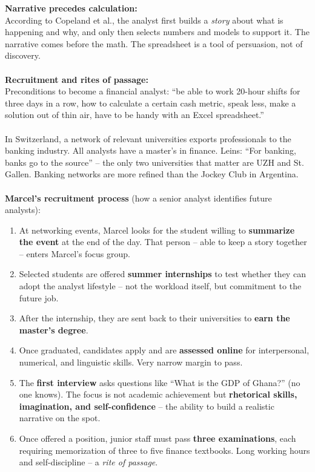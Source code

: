 \documentclass[a4paper,12pt]{article}
\begin{document}
\noindent \textbf{Narrative precedes calculation:} \\
\noindent According to Copeland et al., the analyst first builds a \emph{story} about what is happening and why, and only then selects numbers and models to support it. The narrative comes before the math. The spreadsheet is a tool of persuasion, not of discovery. \\
\\
\noindent \textbf{Recruitment and rites of passage:} \\
\noindent Preconditions to become a financial analyst: ``be able to work 20-hour shifts for three days in a row, how to calculate a certain cash metric, speak less, make a solution out of thin air, have to be handy with an Excel spreadsheet.'' \\
\\
\noindent In Switzerland, a network of relevant universities exports professionals to the banking industry. All analysts have a master's in finance. Leins: ``For banking, banks go to the source'' -- the only two universities that matter are UZH and St. Gallen. Banking networks are more refined than the Jockey Club in Argentina. \\
\\
\noindent \textbf{Marcel's recruitment process} (how a senior analyst identifies future analysts):
\begin{enumerate}
	\item At networking events, Marcel looks for the student willing to \textbf{summarize the event} at the end of the day. That person -- able to keep a story together -- enters Marcel's focus group.
	\item Selected students are offered \textbf{summer internships} to test whether they can adopt the analyst lifestyle -- not the workload itself, but commitment to the future job.
	\item After the internship, they are sent back to their universities to \textbf{earn the master's degree}.
	\item Once graduated, candidates apply and are \textbf{assessed online} for interpersonal, numerical, and linguistic skills. Very narrow margin to pass.
	\item The \textbf{first interview} asks questions like ``What is the GDP of Ghana?'' (no one knows). The focus is not academic achievement but \textbf{rhetorical skills, imagination, and self-confidence} -- the ability to build a realistic narrative on the spot.
	\item Once offered a position, junior staff must pass \textbf{three examinations}, each requiring memorization of three to five finance textbooks. Long working hours and self-discipline -- a \emph{rite of passage}.
\end{enumerate}
\end{document}
